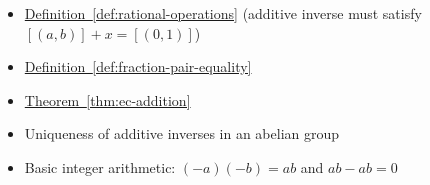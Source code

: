 \begin{dependencies}
\begin{itemize}
  \item \hyperref[def:rational-operations]{Definition~\ref*{def:rational-operations}}
        \textnormal{(additive inverse must satisfy $[(a,b)] + x = [(0,1)]$)}
  \item \hyperref[def:fraction-pair-equality]{Definition~\ref*{def:fraction-pair-equality}}
  \item \hyperref[thm:ec-addition]{Theorem~\ref*{thm:ec-addition}}
  \item Uniqueness of additive inverses in an abelian group
  \item Basic integer arithmetic: $(-a)(-b) = ab$ and $ab - ab = 0$
\end{itemize}
\end{dependencies}

\clearpage
